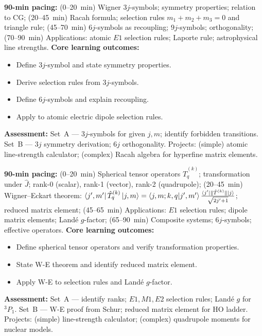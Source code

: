 \documentclass[11pt,a4paper]{article}
\begin{document}
\medskip

\begin{tcolorbox}[modulebox, title={Module~II.3 / L06: Wigner $3j$-Symbols and Racah Algebra}]
\textbf{90-min pacing:} (0--20~min) Wigner $3j$-symbols; symmetry properties; relation to CG; (20--45~min) Racah formula; selection rules $m_1+m_2+m_3=0$ and triangle rule; (45--70~min) $6j$-symbols as recoupling; $9j$-symbols; orthogonality; (70--90~min) Applications: atomic $E1$ selection rules; Laporte rule; astrophysical line strengths.
\medskip\textbf{Core learning outcomes:}
\begin{itemize}[leftmargin=1.4em,topsep=2pt,itemsep=1pt]
  \item Define $3j$-symbol and state symmetry properties.
  \item Derive selection rules from $3j$-symbols.
  \item Define $6j$-symbols and explain recoupling.
  \item Apply to atomic electric dipole selection rules.
\end{itemize}
\medskip\textbf{Assessment:}
Set~A --- $3j$-symbols for given $j,m$; identify forbidden transitions.
Set~B --- $3j$ symmetry derivation; $6j$ orthogonality.
Projects: (simple) atomic line-strength calculator; (complex) Racah algebra for hyperfine matrix elements.
\end{tcolorbox}

\medskip

\begin{tcolorbox}[modulebox, title={Module~II.3 / L07: The Wigner--Eckart Theorem}]
\textbf{90-min pacing:} (0--20~min) Spherical tensor operators $\hat{T}^{(k)}_q$; transformation under $\hat{J}$; rank-0 (scalar), rank-1 (vector), rank-2 (quadrupole); (20--45~min) Wigner--Eckart theorem: $\bra{j',m'}\hat{T}^{(k)}_q\ket{j,m}=\braket{j,m;k,q|j',m'}\tfrac{\bra{j'}\|\hat{T}^{(k)}\|\ket{j}}{\sqrt{2j'+1}}$; reduced matrix element; (45--65~min) Applications: $E1$ selection rules; dipole matrix elements; Land\'e $g$-factor; (65--90~min) Composite systems; $6j$-symbols; effective operators.
\medskip\textbf{Core learning outcomes:}
\begin{itemize}[leftmargin=1.4em,topsep=2pt,itemsep=1pt]
  \item Define spherical tensor operators and verify transformation properties.
  \item State W-E theorem and identify reduced matrix element.
  \item Apply W-E to selection rules and Land\'e $g$-factor.
\end{itemize}
\medskip\textbf{Assessment:}
Set~A --- identify ranks; $E1,M1,E2$ selection rules; Land\'e $g$ for $^3P_1$.
Set~B --- W-E proof from Schur; reduced matrix element for HO ladder.
Projects: (simple) line-strength calculator; (complex) quadrupole moments for nuclear models.
\end{tcolorbox}
\end{document}
